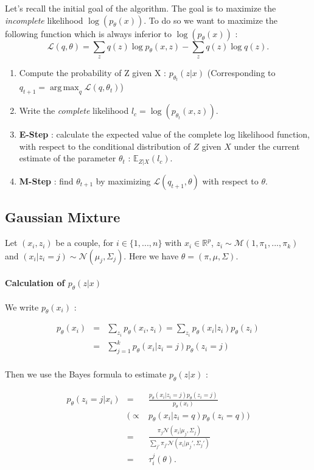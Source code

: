 \documentclass[12pt]{report}
\begin{document}
Let's recall the initial goal of the algorithm. The goal is to maximize the \textit{incomplete} likelihood $\log(p_{\theta}(x))$. To do so we want to maximize the following function which is always inferior to $\log(p_{\theta}(x))$ :
$$ \mathcal{L}(q,\theta) = \sum_z q(z) \log p_{\theta}(x,z) - \sum_z q(z) \log q(z).$$
\begin{enumerate}
\item Compute the probability of Z given X : $p_{\theta_t}(z|x)$ (Corresponding to $q_{t+1} =\operatorname{arg\,max}_q\mathcal{L}(q,\theta_t)$)
\item Write the \textit{complete} likelihood $l_c =
  \log(p_{\theta_t}(x,z))$.
\item \textbf{E-Step} : calculate the expected value of the complete log likelihood function, with respect to the conditional distribution of $Z$ given $X$ under the current estimate of the parameter $\theta_t$ :
  $\mathbb{E}_{Z|X}(l_c)$.
\item \textbf{M-Step} : find $\theta_{t+1}$ by maximizing $ \mathcal{L}(q_{t+1},\theta)$ with respect to $\theta$.
\end{enumerate}


\subsection{Gaussian Mixture}

Let $(x_i,z_i)$ be a couple, for $i \in \{1,...,n\}$ with $x_i \in \mathbb{R}^p$, $z_i \sim \mathcal{M}(1,\pi_1,...,\pi_k)$  and
$(x_i|z_i=j) \sim \mathcal{N}(\mu_j, \Sigma_j)$. Here we have $\theta = (\pi, \mu, \Sigma)$.

\paragraph{Calculation of $p_{\theta}(z|x)$}

We write $p_{\theta}(x_i)$ :

\begin{eqnarray*}
  p_\theta(x_i) & = & \sum_{z_i} p_\theta(x_i,z_i) = \sum_{z_i} p_\theta(x_i|z_i)p_\theta(z_i)\\
  & = & \sum_{j=1}^k p_\theta(x_i|z_i=j)p_\theta(z_i=j)\\
\end{eqnarray*}

Then we use the Bayes formula to estimate $p_{\theta}(z|x)$ :

\begin{eqnarray*}
p_\theta(z_i=j|x_i) & = & \frac{p_\theta(x_i|z_i=j)p_\theta(z_i=j)}{p_\theta(x_i)}\\
&( \varpropto & p_\theta(x_i|z_i=q)p_\theta(z_i=q) )\\
& = & \frac{\pi_j\mathcal{N}(x_i|\mu_j,\Sigma_j)}{\sum_{j'}\pi_{j'}\mathcal{N}(x_i|\mu_j',\Sigma_j')}\\
& = & \tau_i^j(\theta).
\end{eqnarray*}
\end{document}
